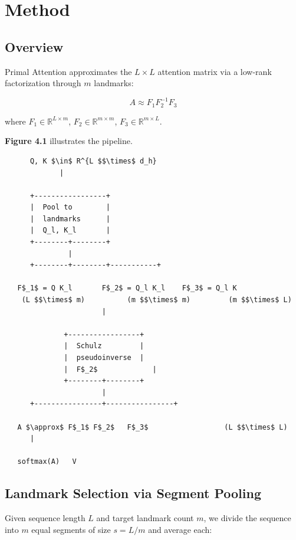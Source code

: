 
\section{Method}

\subsection{Overview}

Primal Attention approximates the $L \times L$ attention matrix via a 
low-rank factorization through $m$ landmarks:

\begin{equation}
A \approx F_1 F_2^{-1} F_3
\end{equation}

where $F_1 \in \mathbb{R}^{L \times m}$, $F_2 \in \mathbb{R}^{m \times m}$, 
$F_3 \in \mathbb{R}^{m \times L}$.

\textbf{Figure 4.1} illustrates the pipeline.

\begin{lstlisting}
      Q, K $\in$ R^{L $$\times$ d_h}
             |
              
      +-----------------+
      |  Pool to        |
      |  landmarks      |
      |  Q_l, K_l       |
      +--------+--------+
               |
      +--------+--------+-----------+
                                     
   F$_1$ = Q K_l       F$_2$ = Q_l K_l    F$_3$ = Q_l K 
    (L $$\times$ m)          (m $$\times$ m)         (m $$\times$ L)
                       |
                        
              +-----------------+
              |  Schulz         |
              |  pseudoinverse  |
              |  F$_2$             |
              +--------+--------+
                       |
      +----------------+----------------+
                                         
   A $\approx$ F$_1$ F$_2$   F$_3$                  (L $$\times$ L)
      |
       
   softmax(A)   V
\end{lstlisting}

\subsection{Landmark Selection via Segment Pooling}

Given sequence length $L$ and target landmark count $m$, we divide the 
sequence into $m$ equal segments of size $s = L / m$ and average each:

